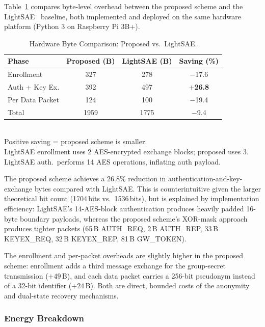 \documentclass[conference]{IEEEtran}
\begin{document}
Table~\ref{tab:hwcompare} compares byte-level overhead between the proposed
scheme and the LightSAE~\cite{rosa2023lightsae} baseline, both implemented
and deployed on the same hardware platform (Python 3 on Raspberry Pi 3B+).

\begin{table}[!t]
  \centering
  \caption{Hardware Byte Comparison: Proposed vs.\ LightSAE.}
  \label{tab:hwcompare}
  \scriptsize
  \setlength{\tabcolsep}{4pt}
  \begin{tabular}{lccc}
    \toprule
    Phase & Proposed (B) & LightSAE (B) & Saving (\%) \\
    \midrule
    Enrollment       & 327 & 278  & $-$17.6 \\
    Auth + Key Ex.   & 392 & 497  & $+$\textbf{26.8} \\
    Per Data Packet  & 124 & 100  & $-$19.4 \\
    Total            & 1959 & 1775 & $-$9.4 \\
    \bottomrule
  \end{tabular}\\[3pt]
  \scriptsize
  Positive saving = proposed scheme is smaller.\\
  LightSAE enrollment uses 2 AES-encrypted exchange blocks; proposed uses 3.\\
  LightSAE auth.\ performs 14 AES operations, inflating auth payload.
\end{table}

The proposed scheme achieves a $\mathbf{26.8\%}$ reduction in
authentication-and-key-exchange bytes compared with LightSAE.  This is
counterintuitive given the larger theoretical bit count (1704\,bits
vs.\ 1536\,bits), but is explained by implementation efficiency:
LightSAE's 14-AES-block authentication produces heavily padded 16-byte
boundary payloads, whereas the proposed scheme's XOR-mask approach produces
tighter packets (65\,B AUTH\_REQ, 2\,B AUTH\_REP, 33\,B KEYEX\_REQ,
32\,B KEYEX\_REP, 81\,B GW\_TOKEN).

The enrollment and per-packet overheads are slightly higher in the proposed
scheme: enrollment adds a third message exchange for the group-secret
transmission ($+49$\,B), and each data packet carries a 256-bit pseudonym
instead of a 32-bit identifier ($+24$\,B).  Both are direct, bounded costs
of the anonymity and dual-state recovery mechanisms.

\subsubsection{Energy Breakdown}
\end{document}
